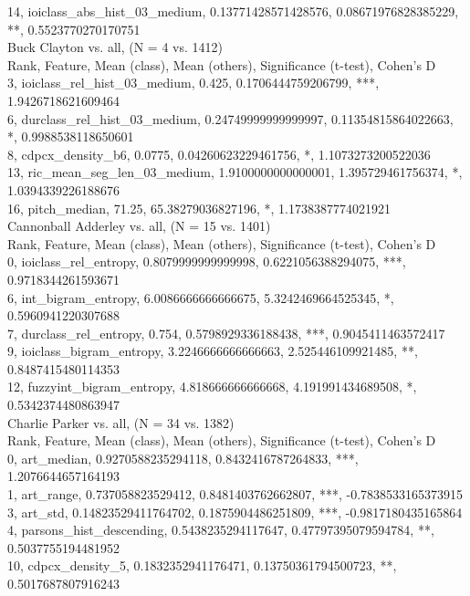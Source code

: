 14, ioiclass_abs_hist_03_medium, 0.13771428571428576, 0.08671976828385229, **, 0.5523770270170751\\
Buck Clayton vs. all, (N = 4 vs. 1412)\\
Rank, Feature, Mean (class), Mean (others), Significance (t-test), Cohen's D\\
3, ioiclass_rel_hist_03_medium, 0.425, 0.1706444759206799, ***, 1.9426718621609464\\
6, durclass_rel_hist_03_medium, 0.24749999999999997, 0.11354815864022663, *, 0.9988538118650601\\
8, cdpcx_density_b6, 0.0775, 0.04260623229461756, *, 1.1073273200522036\\
13, ric_mean_seg_len_03_medium, 1.9100000000000001, 1.395729461756374, *, 1.0394339226188676\\
16, pitch_median, 71.25, 65.38279036827196, *, 1.1738387774021921\\
Cannonball Adderley vs. all, (N = 15 vs. 1401)\\
Rank, Feature, Mean (class), Mean (others), Significance (t-test), Cohen's D\\
0, ioiclass_rel_entropy, 0.8079999999999998, 0.6221056388294075, ***, 0.9718344261593671\\
6, int_bigram_entropy, 6.0086666666666675, 5.3242469664525345, *, 0.5960941220307688\\
7, durclass_rel_entropy, 0.754, 0.5798929336188438, ***, 0.9045411463572417\\
9, ioiclass_bigram_entropy, 3.2246666666666663, 2.525446109921485, **, 0.8487415480114353\\
12, fuzzyint_bigram_entropy, 4.818666666666668, 4.191991434689508, *, 0.5342374480863947\\
Charlie Parker vs. all, (N = 34 vs. 1382)\\
Rank, Feature, Mean (class), Mean (others), Significance (t-test), Cohen's D\\
0, art_median, 0.9270588235294118, 0.8432416787264833, ***, 1.2076644657164193\\
1, art_range, 0.737058823529412, 0.8481403762662807, ***, -0.7838533165373915\\
3, art_std, 0.14823529411764702, 0.1875904486251809, ***, -0.9817180435165864\\
4, parsons_hist_descending, 0.5438235294117647, 0.47797395079594784, **, 0.5037755194481952\\
10, cdpcx_density_5, 0.1832352941176471, 0.13750361794500723, **, 0.5017687807916243\\
